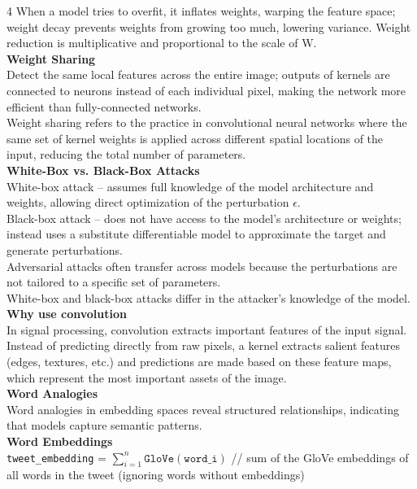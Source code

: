 \documentclass[8pt]{extarticle}
\begin{document}
\begin{multicols}{4}
{When a model tries to overfit, it inflates weights, warping the feature space; weight decay prevents weights from growing too much, lowering variance. Weight reduction is multiplicative and proportional to the scale of W.\\
\vspace{2pt}\textbf{Weight Sharing}\\
Detect the same local features across the entire image; outputs of kernels are connected to neurons instead of each individual pixel, making the network more efficient than fully-connected networks.\\
Weight sharing refers to the practice in convolutional neural networks where the same set of kernel weights is applied across different spatial locations of the input, reducing the total number of parameters.\\
\vspace{2pt}\textbf{White-Box vs. Black-Box Attacks}\\
White-box attack -- assumes full knowledge of the model architecture and weights, allowing direct optimization of the perturbation $\epsilon$.\\
Black-box attack -- does not have access to the model's architecture or weights; instead uses a substitute differentiable model to approximate the target and generate perturbations.\\
Adversarial attacks often transfer across models because the perturbations are not tailored to a specific set of parameters.\\
White-box and black-box attacks differ in the attacker's knowledge of the model.\\
\vspace{2pt}\textbf{Why use convolution}\\
In signal processing, convolution extracts important features of the input signal. Instead of predicting directly from raw pixels, a kernel extracts salient features (edges, textures, etc.) and predictions are made based on these feature maps, which represent the most important assets of the image.\\
\vspace{2pt}\textbf{Word Analogies}\\
Word analogies in embedding spaces reveal structured relationships, indicating that models capture semantic patterns.\\
\vspace{2pt}\textbf{Word Embeddings}\\
\texttt{tweet\_embedding} = $\sum_{i=1}^{n} \texttt{GloVe}(\texttt{word\_i})$ // sum of the GloVe embeddings of all words in the tweet (ignoring words without embeddings)\\
}
\end{multicols}
\end{document}
